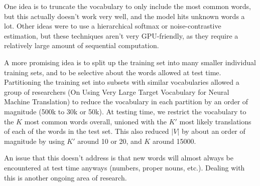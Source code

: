 One idea is to truncate the vocabulary to only include the most common words, but this actually doesn't work very well, and the model hits unknown words a lot. Other ideas were to use a hierarchical softmax or noise-contrastive estimation, but these techniques aren't very GPU-friendly, as they require a relatively large amount of sequential computation.

A more promising idea is to split up the training set into many smaller individual training sets, and to be selective about the words allowed at test time. Partitioning the training set into subsets with similar vocabularies allowed a group of researchers (On Using Very Large Target Vocabulary for Neural Machine Translation) to reduce the vocabulary in each partition by an order of magnitude (500k to 30k or 50k). At testing time, we restrict the vocabulary to the $K$ most common words overall, unioned with the $K'$ most likely translations of each of the words in the test set. This also reduced $|V|$ by about an order of magnitude by using $K'$ around 10 or 20, and $K$ around 15000.

An issue that this doesn't address is that new words will almost always be encountered at test time anyways (numbers, proper nouns, etc.). Dealing with this is another ongoing area of research.
